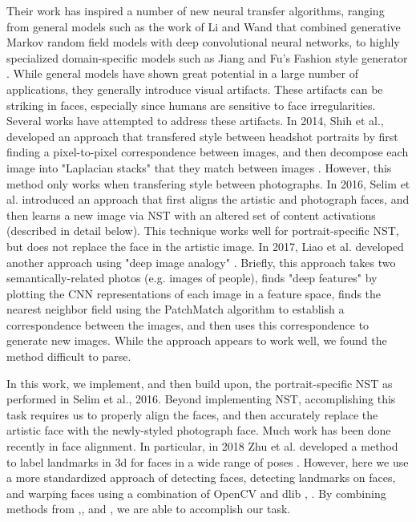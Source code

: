 \documentclass{article}
\begin{document}
Their work has inspired a number of new neural transfer algorithms, ranging from general models such as the work of Li and Wand \cite{li2016combining} that combined generative Markov random field models with deep convolutional neural networks, to highly specialized domain-specific models such as Jiang and Fu's Fashion style generator \cite{jiang2017fashion}. While general models have shown great potential in a large number of applications, they generally introduce visual artifacts. These artifacts can be striking in faces, especially since humans are sensitive to face irregularities. Several works have attempted to address these artifacts. In 2014, Shih et al., developed an approach that transfered style between headshot portraits by first finding a pixel-to-pixel correspondence between images, and then decompose each image into "Laplacian stacks" that they match between images \cite{Shih2014}. However, this method only works when transfering style between photographs. In 2016, Selim et al. introduced an approach that first aligns the artistic and photograph faces, and then learns a new image via NST with an altered set of content activations \cite{selim2016painting} (described in detail below). This technique works well for portrait-specific NST, but does not replace the face in the artistic image. In 2017, Liao et al. developed another approach using "deep image analogy" \cite{Liao2017}. Briefly, this approach takes two semantically-related photos (e.g. images of people), finds "deep features" by plotting the CNN representations of each image in a feature space, finds the nearest neighbor field using the PatchMatch algorithm to establish a correspondence between the images, and then uses this correspondence to generate new images. While the approach appears to work well, we found the method difficult to parse. 

In this work, we implement, and then build upon, the portrait-specific NST as performed in Selim et al., 2016. Beyond implementing NST, accomplishing this task requires us to properly align the faces, and then accurately replace the artistic face with the newly-styled photograph face. Much work has been done recently in face alignment. In particular, in 2018 Zhu et al. developed a method to label landmarks in 3d for faces in a wide range of poses \cite{zhu2019face}. However, here we use a more standardized approach of detecting faces, detecting landmarks on faces, and warping faces using a combination of OpenCV and dlib \cite{opencv_library}, \cite{dlib09}. By combining methods from \cite{selim2016painting},\cite{opencv_library}, and \cite{dlib09}, we are able to accomplish our task.
\end{document}
